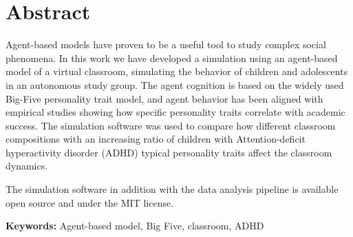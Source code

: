 \chapter{Abstract}

Agent-based models have proven to be a useful tool to study complex social phenomena.
In this work we have developed a simulation using an agent-based model of a virtual
classroom, simulating the behavior of children and adolescents in an autonomous
study group. The agent cognition is based on the widely used Big-Five personality
trait model, and agent behavior has been aligned with empirical studies showing
how specific personality traits correlate with academic success. The simulation
software was used to compare how different classroom compositions with an increasing
ratio of children with Attention-deficit hyperactivity disorder (ADHD) typical
personality traits affect the classroom dynamics.

\bb

The simulation software in addition with the data analysis pipeline is available
open source and under the MIT license. 

\bb

{\bf Keywords:} Agent-based model, Big Five, classroom, ADHD